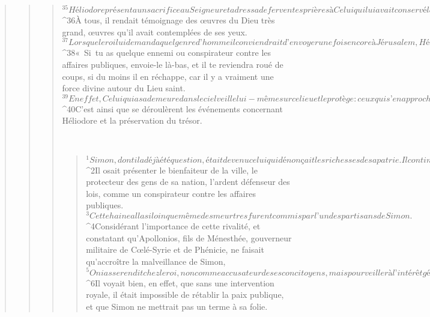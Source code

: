 \begin{verse}
\begin{verse}
\begin{verse}
${}^{35}Héliodore présenta un sacrifice au Seigneur et adressa de ferventes prières à Celui qui lui avait conservé la vie. Puis il prit congé d’Onias et revint avec son armée auprès du roi. 
${}^{36}À tous, il rendait témoignage des œuvres du Dieu très grand, œuvres qu’il avait contemplées de ses yeux. 
${}^{37}Lorsque le roi lui demanda quel genre d’homme il conviendrait d’envoyer une fois encore à Jérusalem, Héliodore répondit : 
${}^{38}« Si tu as quelque ennemi ou conspirateur contre les affaires publiques, envoie-le là-bas, et il te reviendra roué de coups, si du moins il en réchappe, car il y a vraiment une force divine autour du Lieu saint. 
${}^{39}En effet, Celui qui a sa demeure dans le ciel veille lui-même sur ce lieu et le protège : ceux qui s’en approchent avec des intentions mauvaises, il les frappe et les fait périr. » 
${}^{40}C’est ainsi que se déroulèrent les événements concernant Héliodore et la préservation du trésor.
      
         
      \bchapter{}
      \begin{verse}
${}^{1}Simon, dont il a déjà été question, était devenu celui qui dénonçait les richesses de sa patrie. Il continuait à calomnier Onias, en prétendant que c’était lui qui avait assailli Héliodore et provoqué ce malheur. 
${}^{2}Il osait présenter le bienfaiteur de la ville, le protecteur des gens de sa nation, l’ardent défenseur des lois, comme un conspirateur contre les affaires publiques. 
${}^{3}Cette haine alla si loin que même des meurtres furent commis par l’un des partisans de Simon. 
${}^{4}Considérant l’importance de cette rivalité, et constatant qu’Apollonios, fils de Ménesthée, gouverneur militaire de Cœlé-Syrie et de Phénicie, ne faisait qu’accroître la malveillance de Simon, 
${}^{5}Onias se rendit chez le roi, non comme accusateur de ses concitoyens, mais pour veiller à l’intérêt général de tout le peuple et de chacun en particulier. 
${}^{6}Il voyait bien, en effet, que sans une intervention royale, il était impossible de rétablir la paix publique, et que Simon ne mettrait pas un terme à sa folie.
      

\end{verse}
\end{verse}
\end{verse}
\end{verse}
